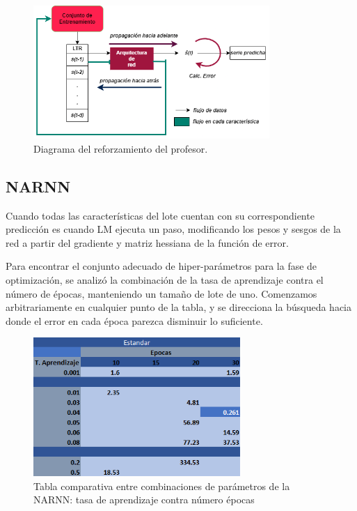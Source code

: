 \begin{figure}[H]
    \centering
    \includegraphics[width=0.8\textwidth]{Figuras/proceso_de_entrenamiento/Reforzamiento_del_profesor.png}
    \caption{Diagrama del reforzamiento del profesor.} 
    \label{fig:reforzamiento_profesor}
\end{figure}

\newpage
\subsection{NARNN}

Cuando todas las características del lote cuentan con su correspondiente predicción es cuando LM ejecuta un paso, modificando los pesos y sesgos de la red a partir del gradiente y matriz hessiana de la función de error.

Para encontrar el conjunto adecuado de hiper-parámetros para la fase de optimización, se analizó la combinación de la tasa de aprendizaje contra el número de épocas, manteniendo un tamaño de lote de uno. Comenzamos arbitrariamente en cualquier punto de la tabla, y se direcciona la búsqueda hacia donde el error en cada época parezca disminuir lo suficiente.

\begin{figure}[H]
    \centering
    \includegraphics[width=0.7\textwidth]{Figuras/proceso_de_entrenamiento/lr_epocas_NARNN_estandar.png}
    \caption{Tabla comparativa entre combinaciones de parámetros de la NARNN: tasa de aprendizaje contra número épocas} 
    \label{fig:lr_epocas_NARNN}
\end{figure}


